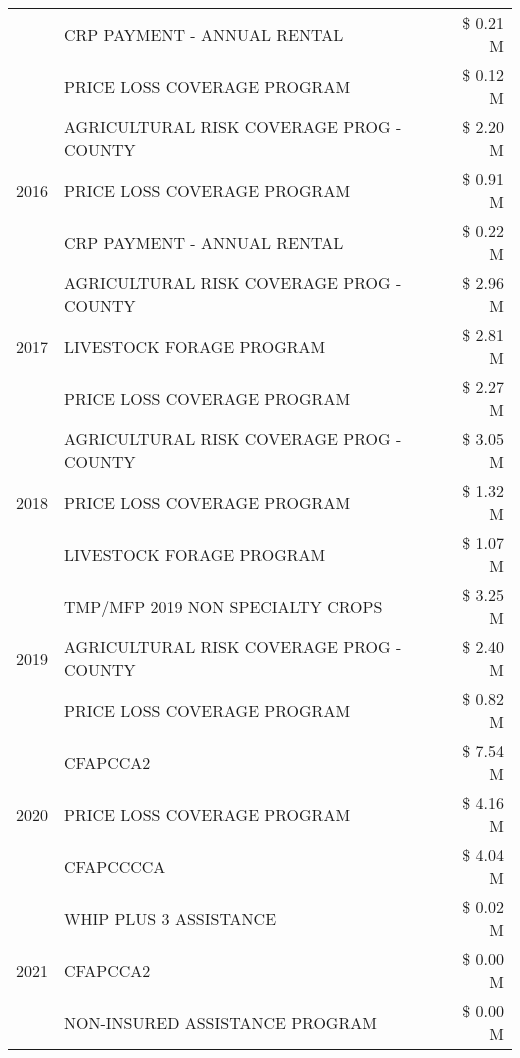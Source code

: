 \begin{tabular}{llr}
 & CRP PAYMENT - ANNUAL RENTAL & \$ 0.21 M \\
 & PRICE LOSS COVERAGE PROGRAM & \$ 0.12 M \\
\cline{1-3}
\multirow[t]{3}{*}{2016} & AGRICULTURAL RISK COVERAGE PROG - COUNTY & \$ 2.20 M \\
 & PRICE LOSS COVERAGE PROGRAM & \$ 0.91 M \\
 & CRP PAYMENT - ANNUAL RENTAL & \$ 0.22 M \\
\cline{1-3}
\multirow[t]{3}{*}{2017} & AGRICULTURAL RISK COVERAGE PROG - COUNTY & \$ 2.96 M \\
 & LIVESTOCK FORAGE PROGRAM & \$ 2.81 M \\
 & PRICE LOSS COVERAGE PROGRAM & \$ 2.27 M \\
\cline{1-3}
\multirow[t]{3}{*}{2018} & AGRICULTURAL RISK COVERAGE PROG - COUNTY & \$ 3.05 M \\
 & PRICE LOSS COVERAGE PROGRAM & \$ 1.32 M \\
 & LIVESTOCK FORAGE PROGRAM & \$ 1.07 M \\
\cline{1-3}
\multirow[t]{3}{*}{2019} & TMP/MFP 2019 NON SPECIALTY CROPS & \$ 3.25 M \\
 & AGRICULTURAL RISK COVERAGE PROG - COUNTY & \$ 2.40 M \\
 & PRICE LOSS COVERAGE PROGRAM & \$ 0.82 M \\
\cline{1-3}
\multirow[t]{3}{*}{2020} & CFAPCCA2 & \$ 7.54 M \\
 & PRICE LOSS COVERAGE PROGRAM & \$ 4.16 M \\
 & CFAPCCCCA & \$ 4.04 M \\
\cline{1-3}
\multirow[t]{3}{*}{2021} & WHIP PLUS 3 ASSISTANCE & \$ 0.02 M \\
 & CFAPCCA2 & \$ 0.00 M \\
 & NON-INSURED ASSISTANCE PROGRAM & \$ 0.00 M \\
\cline{1-3}
\bottomrule
\end{tabular}
